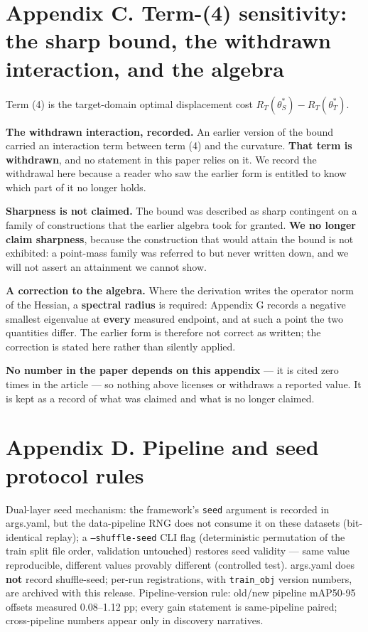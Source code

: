 \documentclass[pdflatex,sn-mathphys-ay]{sn-jnl}
\begin{document}
\section*{Appendix C. Term-(4) sensitivity: the sharp bound, the withdrawn interaction, and the algebra}

Term (4) is the target-domain optimal displacement cost $R_T(\theta^*_S)-R_T(\theta^*_T)$.

\textbf{The withdrawn interaction, recorded.} An earlier version of the bound carried an interaction term between term (4) and the curvature. \textbf{That term is withdrawn}, and no statement in this paper relies on it. We record the withdrawal here because a reader who saw the earlier form is entitled to know which part of it no longer holds.

\textbf{Sharpness is not claimed.} The bound was described as sharp contingent on a family of constructions that the earlier algebra took for granted. \textbf{We no longer claim sharpness}, because the construction that would attain the bound is not exhibited: a point-mass family was referred to but never written down, and we will not assert an attainment we cannot show.

\textbf{A correction to the algebra.} Where the derivation writes the operator norm of the Hessian, a \textbf{spectral radius} is required: Appendix G records a negative smallest eigenvalue at \textbf{every} measured endpoint, and at such a point the two quantities differ. The earlier form is therefore not correct as written; the correction is stated here rather than silently applied.

\textbf{No number in the paper depends on this appendix} --- it is cited zero times in the article --- so nothing above licenses or withdraws a reported value. It is kept as a record of what was claimed and what is no longer claimed.

\section*{Appendix D. Pipeline and seed protocol rules}

Dual-layer seed mechanism: the framework's \texttt{seed} argument is recorded in args.yaml, but the data-pipeline RNG does not consume it on these datasets (bit-identical replay); a \texttt{--shuffle-seed} CLI flag (deterministic permutation of the train split file order, validation untouched) restores seed validity --- same value reproducible, different values provably different (controlled test). args.yaml does \textbf{not} record shuffle-seed; per-run registrations, with \texttt{train\_obj} version numbers, are archived with this release. Pipeline-version rule: old/new pipeline mAP50-95 offsets measured 0.08--1.12 pp; every gain statement is same-pipeline paired; cross-pipeline numbers appear only in discovery narratives.
\end{document}
